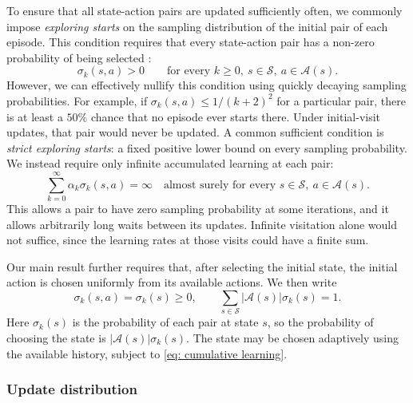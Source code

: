 \documentclass[twoside,11pt]{article}
\DeclareRobustCommand{\reviewbarstart}{%
  \ifhmode %
    \vadjust{\vbox to 0pt{%
      \vskip-\ht\strutbox %
      \vskip-\dp\strutbox %
      \cbstart[\changebarwidth] %
      \vss %
    }}%
  \else %
    \cbstart[\changebarwidth]%
  \fi %
} %
\providecommand{\DIFadd}[1]{#1} %
\providecommand{\DIFaddbegin}{\reviewbarstart} %
\providecommand{\DIFaddend}{\protect\cbend} %
\def\DIFadd#1{#1}%
\def\DIFaddbegin{}%
\def\DIFaddend{}%
\begin{document}
To ensure that all state-action pairs are updated sufficiently often, we commonly impose \textit{exploring starts} on the sampling distribution of the initial  pair of each episode. This condition requires that every state-action pair has a non-zero probability of being selected \DIFaddbegin \DIFadd{:
}\[
\DIFadd{\sigma_k(s,a)>0\qquad\text{for every }k\ge0,\ s\in\mathcal S,\ a\in\mathcal A(s).
}\]\DIFaddend 
However, we can effectively nullify this condition using quickly decaying sampling  \DIFaddbegin \DIFadd{probabilities}\DIFaddend .
For example, if  \DIFaddbegin \DIFadd{$\sigma_k(s,a)\le1/(k+2)^2$ for a particular pair}\DIFaddend , there is \DIFaddbegin \DIFadd{at least }\DIFaddend a $50\%$ chance that no episode ever starts  \DIFaddbegin \DIFadd{there}\DIFaddend . Under initial-visit updates, that pair would  never be updated.
 \DIFaddbegin \DIFadd{A common sufficient condition is }\DIFaddend \textit{strict exploring starts}:  \DIFaddbegin \DIFadd{a fixed positive lower bound on every sampling probability. We instead require only infinite accumulated learning at each pair:
}\begin{equation}
\DIFadd{\label{eq: cumulative learning}
\sum_{k=0}^{\infty}\alpha_k\sigma_k(s,a)=\infty
\quad\text{almost surely for every }s\in\mathcal S,\ a\in\mathcal A(s).
}\end{equation}\DIFaddend 
\DIFaddbegin \DIFadd{This allows a pair to have zero sampling probability at some iterations, and it allows arbitrarily long waits between its updates. Infinite visitation alone would not suffice, since the learning rates at those visits could have a finite sum.
}\DIFaddend 

\DIFaddbegin \DIFadd{Our main result further requires that, after selecting the initial state, the initial action is chosen uniformly from its available actions. We then write
}\begin{equation}
\DIFadd{\label{eq: uniform starts}
\sigma_k(s,a)=\sigma_k(s)\ge0,
\qquad
\sum_{s\in\mathcal S}|\mathcal A(s)|\sigma_k(s)=1.
}\end{equation}
\DIFadd{Here $\sigma_k(s)$ is the probability of each pair at state $s$, so the probability of choosing the state is $|\mathcal A(s)|\sigma_k(s)$. The state may be chosen adaptively using the available history, subject to \eqref{eq: cumulative learning}.
}

\DIFaddend \subsubsection{Update distribution}
\end{document}
